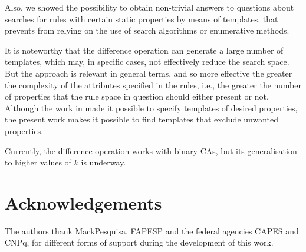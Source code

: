 \documentclass{llncs}
\begin{document}
Also, we showed the possibility to obtain non-trivial answers to questions about searches for rules with certain static properties by means of templates, that prevents from relying on the use of search algorithms or enumerative methods.

It is noteworthy that the difference operation can generate a large number of templates, which may, in specific cases, not effectively reduce the search space. But the approach is relevant in general terms, and so more effective the greater the complexity of the attributes specified in the rules, i.e., the greater the number of properties that the rule space in question should either present or not. Although the work in \cite{deOliveira2014,deOliveira2014b} made it possible to specify templates of desired properties, the present work makes it possible to find templates that exclude unwanted properties.

Currently, the difference operation works with binary CAs, but its generalisation to higher values of $k$ is underway.

\section*{Acknowledgements}
\label{sec:agrdecimentos}
The authors thank MackPesquisa, FAPESP and the federal agencies CAPES and CNPq, for different forms of support during the development of this work.



\end{document}

